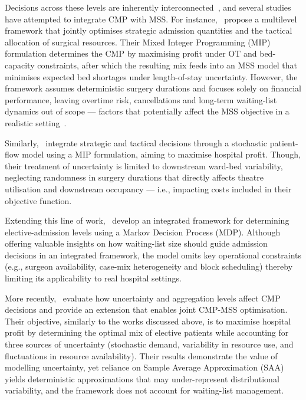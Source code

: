 \documentclass[review,3p,authoryear]{elsarticle}
\begin{document}
Decisions across these levels are inherently interconnected~\citep{Melo2025}, and several studies have attempted to integrate CMP with MSS.
For instance,~\citet{Ma2013Mult} propose a multilevel framework that jointly optimises strategic admission quantities and the tactical allocation of surgical resources. 
Their Mixed Integer Programming (MIP) formulation determines the CMP by maximising profit under OT and bed-capacity constraints, after which the resulting mix feeds into an MSS model that minimises expected bed shortages under length-of-stay uncertainty.
However, the framework assumes deterministic surgery durations and focuses solely on financial performance, leaving overtime risk, cancellations and long-term waiting-list dynamics out of scope --- factors that potentially affect the MSS objective in a realistic setting~\citep{Siqueira2018INTO, Kayvanfar2025}.

Similarly,~\citet{Fugener2015} integrate strategic and tactical decisions through a stochastic patient-flow model using a MIP formulation, aiming to maximise hospital profit.
Though, their treatment of uncertainty is limited to downstream ward-bed variability, neglecting randomness in surgery durations that directly affects theatre utilisation and downstream occupancy --- i.e., impacting costs included in their objective function.

Extending this line of work,~\citet{Liu2019} develop an integrated framework for determining elective-admission levels using a Markov Decision Process (MDP). 
Although offering valuable insights on how waiting-list size should guide admission decisions in an integrated framework, the model omits key operational constraints (e.g., surgeon availability, case-mix heterogeneity and block scheduling) thereby limiting its applicability to real hospital settings. 

More recently,~\citet{Mcrae2020} evaluate how uncertainty and aggregation levels affect CMP decisions and provide an extension that enables joint CMP-MSS optimisation.
Their objective, similarly to the works discussed above, is to maximise hospital profit by determining the optimal mix of elective patients while accounting for three sources of uncertainty (stochastic demand, variability in resource use, and fluctuations in resource availability). 
Their results demonstrate the value of modelling uncertainty, yet reliance on Sample Average Approximation (SAA) yields deterministic approximations that may under-represent distributional variability, and the framework does not account for waiting-list management.
\end{document}

